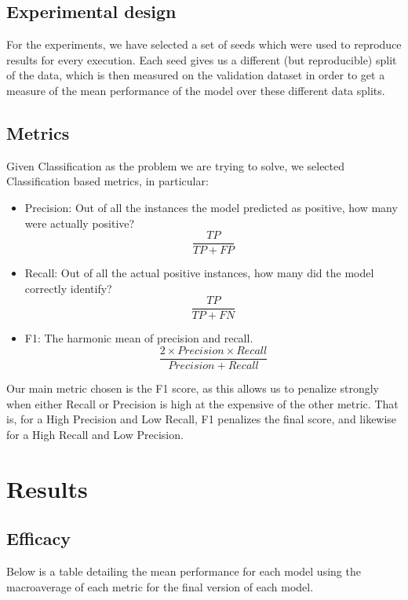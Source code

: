 \documentclass[12pt,a4paper]{article}
\begin{document}
\subsection{Experimental design}
For the experiments, we have selected a set of seeds which were used to reproduce results for every execution. Each seed gives us a different (but reproducible) split of the data, which is then measured on the validation dataset in order to get a measure of the mean performance of the model over these different data splits.

\vspace{0.5cm}

\subsection{Metrics}
Given Classification as the problem we are trying to solve, we selected Classification based metrics, in particular:
\begin{itemize}
\item Precision: Out of all the instances the model predicted as positive, how many were actually positive? $$\frac{TP}{TP+FP}$$
\item Recall: Out of all the actual positive instances, how many did the model correctly identify? $$\frac{TP}{TP+FN}$$
\item F1: The harmonic mean of precision and recall. $$\frac{2 \times Precision \times Recall}{Precision + Recall}$$
\end{itemize}
Our main metric chosen is the F1 score, as this allows us to penalize strongly when either Recall or Precision is high at the expensive of the other metric. That is, for a High Precision and Low Recall, F1 penalizes the final score, and likewise for a High Recall and Low Precision.

\vspace{1.0cm}

\section{Results}
\label{sec:Results}

\subsection{Efficacy}
Below is a table detailing the mean performance for each model using the macroaverage of each metric for the final version of each model.
\end{document}
